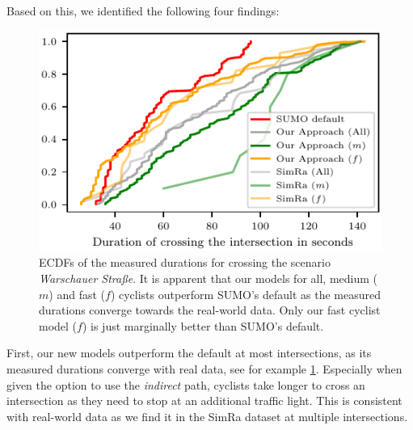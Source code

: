 Based on this, we identified the following four findings:
\begin{figure}[t]
    \centering
    \includegraphics[width=\columnwidth]{fig/im_warschauer_ecdf_every.pdf}
    \caption{%
        ECDFs of the measured durations for crossing the scenario \textit{Warschauer Straße}.
        It is apparent that our models for all, medium ($m$) and fast ($f$) cyclists outperform SUMO's default as the measured durations converge towards the real-world data.
        Only our fast cyclist model ($f$) is just marginally better than SUMO's default.
    }%
    \label{fig:im_warschauer}
\end{figure}
First, our new models outperform the default at most intersections, as its measured durations converge with real data, see for example \cref{fig:im_warschauer}.
Especially when given the option to use the \textit{indirect} path, cyclists take longer to cross an intersection as they need to stop at an additional traffic light.
This is consistent with real-world data as we find it in the SimRa dataset at multiple intersections.

